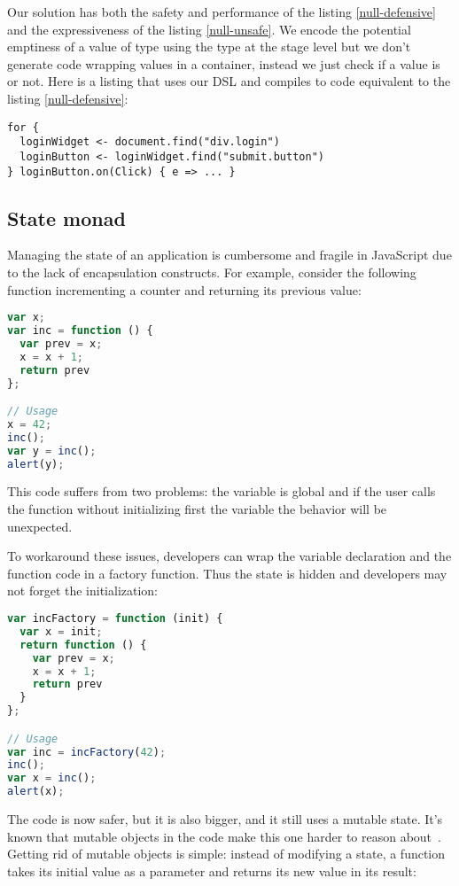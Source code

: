 \documentclass[american,english,runningheads]{llncs}
\begin{document}
Our solution has both the safety and performance of the listing \ref{null-defensive} and the expressiveness of the listing \ref{null-unsafe}. We encode the potential emptiness of a value of type  using the  type at the stage level but we don’t generate code wrapping values in a container, instead we just check if a value is  or not. Here is a listing that uses our DSL and compiles to code equivalent to the listing \ref{null-defensive}:

\begin{lstlisting}
for {
  loginWidget <- document.find("div.login")
  loginButton <- loginWidget.find("submit.button")
} loginButton.on(Click) { e => ... }
\end{lstlisting}

\subsection{State monad}

Managing the state of an application is cumbersome and fragile in JavaScript due to the lack of encapsulation constructs. For example, consider the following function incrementing a counter and returning its previous value:
\begin{lstlisting}[language=JavaScript,label=state-fragile,caption=Fragile state handling]
var x;
var inc = function () {
  var prev = x;
  x = x + 1;
  return prev
};

// Usage
x = 42;
inc();
var y = inc();
alert(y);
\end{lstlisting}
This code suffers from two problems: the variable  is global and if the user calls the  function without initializing first the  variable the behavior will be unexpected.

To workaround these issues, developers can wrap the variable declaration and the  function code in a factory function. Thus the state is hidden and developers may not forget the initialization:

\begin{lstlisting}[language=JavaScript,label=state-encapsulated,caption=State encapsulation within a function]
var incFactory = function (init) {
  var x = init;
  return function () {
    var prev = x;
    x = x + 1;
    return prev
  }
};

// Usage
var inc = incFactory(42);
inc();
var x = inc();
alert(x);
\end{lstlisting}

The code is now safer, but it is also bigger, and it still uses a mutable state. It’s known that mutable objects in the code make this one harder to reason about~\cite{Grogono94_Immutability,Kjolstad11_Immutability}. Getting rid of mutable objects is simple: instead of modifying a state, a function takes its initial value as a parameter and returns its new value in its result:
\end{document}
